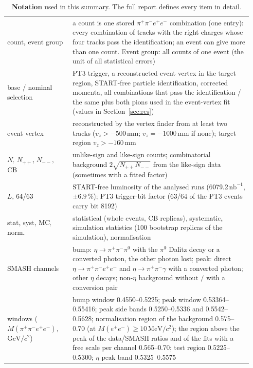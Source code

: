 \documentclass[11pt,a4paper]{article}
\renewcommand{\arraystretch}{1.15}
\newcommand{\piz}{\ensuremath{\pi^{0}}\xspace}
\newcommand{\pipi}{\ensuremath{\pi^{+}\pi^{-}}\xspace}
\newcommand{\ppee}{\ensuremath{\pi^{+}\pi^{-}e^{+}e^{-}}\xspace}
\newcommand{\Mfour}{\ensuremath{M(\pi^{+}\pi^{-}e^{+}e^{-})}\xspace}
\newcommand{\Mee}{\ensuremath{M(e^{+}e^{-})}\xspace}
\newcommand{\nbinv}{\ensuremath{\mathrm{nb}^{-1}}\xspace}
\newcommand{\GeVcc}{\ensuremath{\mathrm{GeV}/c^{2}}\xspace}
\newcommand{\MeVcc}{\ensuremath{\mathrm{MeV}/c^{2}}\xspace}
\newcommand{\vz}{\ensuremath{v_z}\xspace}
\begin{document}
{\footnotesize
\setlength{\tabcolsep}{4pt}
\renewcommand{\arraystretch}{1.0}
\begin{longtable}{@{}>{\raggedright\arraybackslash}p{3.6cm} >{\raggedright\arraybackslash}p{\dimexpr\textwidth-3.6cm-2\tabcolsep\relax}@{}}
\caption{\textbf{Notation} used in this summary. The full report defines every item in detail.}\label{tab:nota}\\
\toprule
\endfirsthead
\toprule
\endhead
\bottomrule
\endfoot
count, event group & a count is one stored \ppee combination (one entry): every combination of tracks with the right charges whose four tracks pass the identification; an event can give more than one count. Event group: all counts of one event (the unit of all statistical errors) \\
base / nominal selection & PT3 trigger, a reconstructed event vertex in the target region, START-free particle identification, corrected momenta, all combinations that pass the identification / the same plus both pions used in the event-vertex fit (values in Section~\ref{sec:res}) \\
event vertex & reconstructed by the vertex finder from at least two tracks ($\vz>-500$\,mm; $\vz=-1000$\,mm if none); target region $\vz>-160$\,mm \\
$N$, $N_{++}$, $N_{--}$, CB & unlike-sign and like-sign counts; combinatorial background $2\sqrt{N_{++}N_{--}}$ from the like-sign data (sometimes with a fitted factor) \\
$L$, 64/63 & START-free luminosity of the analysed runs (6079.2\,\nbinv, $\pm6.9$\,\%); PT3 trigger-bit factor (63/64 of the PT3 events carry bit 8192) \\
stat, syst, MC, norm. & statistical (whole events, CB replicas), systematic, simulation statistics (100 bootstrap replicas of the simulation), normalisation \\
SMASH channels & bump: $\eta\to\pipi\piz$ with the \piz Dalitz decay or a converted photon, the other photon lost; peak: direct $\eta\to\ppee$ and $\eta\to\pipi\gamma$ with a converted photon; other $\eta$ decays; non-$\eta$ background without / with a conversion pair \\
windows (\Mfour, \GeVcc) & bump window 0.4550--0.5225; peak window 0.53364--0.55416; peak side bands 0.5250--0.5336 and 0.5542--0.5628; normalisation region of the background 0.575--0.70 (at \Mee$\ge10$\,\MeVcc); the region above the peak of the data/SMASH ratios and of the fits with a free scale per channel 0.565--0.70; test region 0.5225--0.5300; $\eta$ peak band 0.5325--0.5575 \\

\end{longtable}}
\end{document}
